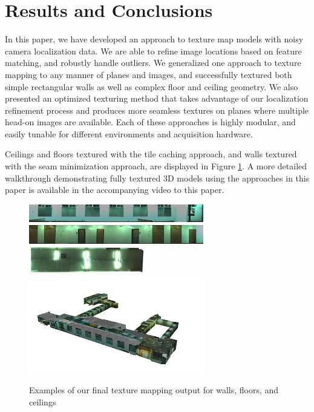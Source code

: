 \message{ !name(paper.tex)}\documentclass[10pt,twocolumn,letterpaper]{article}
\begin{document}
\section{Results and Conclusions}
\label{sec:resultsAndConclusions}
In this paper, we have developed an approach to texture map models with noisy camera localization data. We are
able to refine image locations based on feature matching, and robustly
handle outliers.  We generalized one approach to texture mapping to
any manner of planes and images, and successfully textured both simple
rectangular walls as well as complex floor and ceiling geometry. We
also presented an optimized texturing method that takes advantage of
our localization refinement process and produces more seamless textures on
planes where multiple head-on images are available. Each of these
approaches is highly modular, and easily tunable for different
environments and acquisition hardware.

Ceilings and floors textured with the tile caching approach, and walls
textured with the seam minimization approach, are displayed in Figure
\ref{fig:results}. A more detailed walkthrough demonstrating fully
textured 3D models using the approaches in this paper is available in
the accompanying video to this paper.

\begin{figure}
  \centering
  \includegraphics[width=3in]{4thfloor21.jpg}
  \includegraphics[width=3in]{4thfloor61.jpg}
  \includegraphics[width=2in]{4thfloor8.jpg}
  \includegraphics[width=3in]{fullmodel.png}
  \caption{Examples of our final texture mapping output for walls,
    floors, and ceilings}
  \label{fig:results}
\end{figure}

{\small   }
\end{document}
